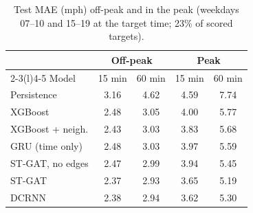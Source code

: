 \begin{table}[t]
\centering
\caption{Test MAE (mph) off-peak and in the peak (weekdays 07--10 and 15--19 at the target time; 23\% of scored targets).}
\label{tab:peak}
\setlength{\tabcolsep}{4pt}
\begin{tabular}{@{}lcccc@{}}
\toprule
 & \multicolumn{2}{c}{Off-peak} & \multicolumn{2}{c}{Peak} \\
\cmidrule(lr){2-3}\cmidrule(l){4-5}
Model & 15 min & 60 min & 15 min & 60 min \\
\midrule
Persistence & 3.16 & 4.62 & 4.59 & 7.74 \\
XGBoost & 2.48 & 3.05 & 4.00 & 5.77 \\
XGBoost + neigh. & 2.43 & 3.03 & 3.83 & 5.68 \\
GRU (time only) & 2.48 & 3.03 & 3.97 & 5.59 \\
ST-GAT, no edges & 2.47 & 2.99 & 3.94 & 5.45 \\
ST-GAT & 2.37 & 2.93 & 3.65 & 5.19 \\
DCRNN & 2.38 & 2.94 & 3.62 & 5.30 \\
\bottomrule
\end{tabular}
\end{table}
